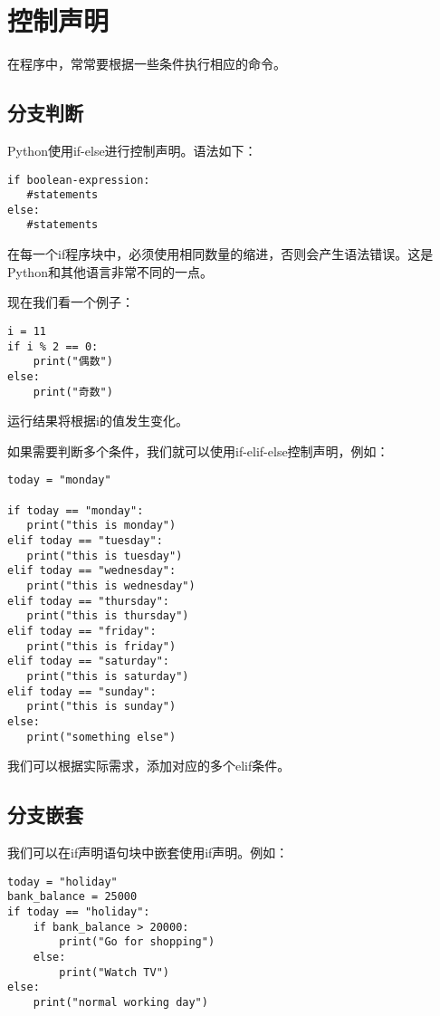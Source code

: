 \section{控制声明}
在程序中，常常要根据一些条件执行相应的命令。

\subsection{分支判断}
Python使用if-else进行控制声明。语法如下：

\begin{lstlisting}
if boolean-expression:
   #statements
else:
   #statements
\end{lstlisting}

\begin{myremark}{}
在每一个if程序块中，必须使用相同数量的缩进，否则会产生语法错误。这是Python和其他语言非常不同的一点。
\end{myremark}

现在我们看一个例子：

\begin{lstlisting}
i = 11
if i % 2 == 0:
    print("偶数")
else:
    print("奇数")
\end{lstlisting}

运行结果将根据i的值发生变化。

如果需要判断多个条件，我们就可以使用if-elif-else控制声明，例如：

\begin{lstlisting}
today = "monday"

if today == "monday":
   print("this is monday")
elif today == "tuesday":
   print("this is tuesday")
elif today == "wednesday":
   print("this is wednesday")
elif today == "thursday":
   print("this is thursday")
elif today == "friday":
   print("this is friday")
elif today == "saturday":
   print("this is saturday")
elif today == "sunday":
   print("this is sunday")
else:
   print("something else")
\end{lstlisting}

我们可以根据实际需求，添加对应的多个elif条件。

\subsection{分支嵌套}
我们可以在if声明语句块中嵌套使用if声明。例如：

\begin{lstlisting}
today = "holiday"
bank_balance = 25000
if today == "holiday":
    if bank_balance > 20000:
        print("Go for shopping")
    else:
        print("Watch TV")
else:
    print("normal working day")
\end{lstlisting}
